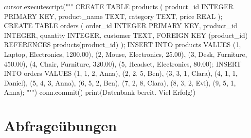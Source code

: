 \documentclass[
  nswissgerman,
  a4paper,
  DIV=11,
  numbers=noendperiod,
  ngerman]{scrreprt}
\newenvironment{Shaded}{\begin{snugshade}}{\end{snugshade}}
\newcommand{\BuiltInTok}[1]{\textcolor[rgb]{0.00,0.23,0.31}{#1}}
\newcommand{\NormalTok}[1]{\textcolor[rgb]{0.00,0.23,0.31}{#1}}
\newcommand{\StringTok}[1]{\textcolor[rgb]{0.13,0.47,0.30}{#1}}
\begin{document}
\begin{Shaded}
\begin{Highlighting}[numbers=left,,]
\NormalTok{cursor.executescript(}\StringTok{"""}
\StringTok{CREATE TABLE products (}
\StringTok{    product\_id   INTEGER PRIMARY KEY,}
\StringTok{    product\_name TEXT,}
\StringTok{    category     TEXT,}
\StringTok{    price        REAL}
\StringTok{);}
\StringTok{CREATE TABLE orders (}
\StringTok{    order\_id    INTEGER PRIMARY KEY,}
\StringTok{    product\_id  INTEGER,}
\StringTok{    quantity    INTEGER,}
\StringTok{    customer    TEXT,}
\StringTok{    FOREIGN KEY (product\_id)}
\StringTok{        REFERENCES products(product\_id)}
\StringTok{);}
\StringTok{INSERT INTO products VALUES}
\StringTok{    (1, \textquotesingle{}Laptop\textquotesingle{},   \textquotesingle{}Electronics\textquotesingle{}, 1200.00),}
\StringTok{    (2, \textquotesingle{}Mouse\textquotesingle{},    \textquotesingle{}Electronics\textquotesingle{},   25.00),}
\StringTok{    (3, \textquotesingle{}Desk\textquotesingle{},     \textquotesingle{}Furniture\textquotesingle{},    450.00),}
\StringTok{    (4, \textquotesingle{}Chair\textquotesingle{},    \textquotesingle{}Furniture\textquotesingle{},    320.00),}
\StringTok{    (5, \textquotesingle{}Headset\textquotesingle{},  \textquotesingle{}Electronics\textquotesingle{},   80.00);}
\StringTok{INSERT INTO orders VALUES}
\StringTok{    (1, 1, 2, \textquotesingle{}Anna\textquotesingle{}),}
\StringTok{    (2, 2, 5, \textquotesingle{}Ben\textquotesingle{}),}
\StringTok{    (3, 3, 1, \textquotesingle{}Clara\textquotesingle{}),}
\StringTok{    (4, 1, 1, \textquotesingle{}Daniel\textquotesingle{}),}
\StringTok{    (5, 4, 3, \textquotesingle{}Anna\textquotesingle{}),}
\StringTok{    (6, 5, 2, \textquotesingle{}Ben\textquotesingle{}),}
\StringTok{    (7, 2, 8, \textquotesingle{}Clara\textquotesingle{}),}
\StringTok{    (8, 3, 2, \textquotesingle{}Evi\textquotesingle{}),}
\StringTok{    (9, 5, 1, \textquotesingle{}Anna\textquotesingle{});}
\StringTok{"""}\NormalTok{)}
\NormalTok{conn.commit()}
\BuiltInTok{print}\NormalTok{(}\StringTok{\textquotesingle{}Datenbank bereit. Viel Erfolg!\textquotesingle{}}\NormalTok{)}
\end{Highlighting}
\end{Shaded}

\section{Abfrageübungen}\label{abfrageuxfcbungen}
\end{document}
